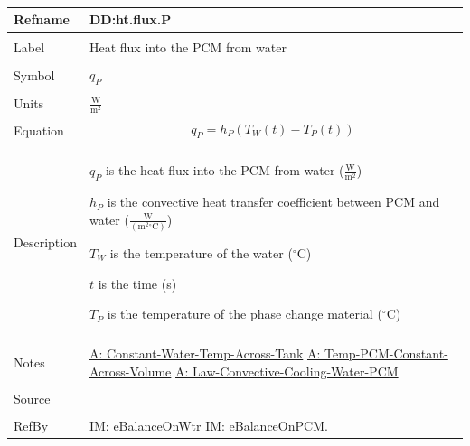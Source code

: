 \documentclass[12pt]{article}
\begin{document}
~\newline
\noindent \begin{minipage}{\textwidth}
\begin{tabular}{p{} p{}}
\toprule \textbf{Refname} & \textbf{DD:ht.flux.P}
\label{DD:ht.flux.P}
\\ \midrule \\
Label & Heat flux into the PCM from water
\\ \midrule \\
Symbol & ${q_{P}}$
\\ \midrule \\
Units & $\frac{\text{W}}{\text{m}^{2}}$
\\ \midrule \\
Equation & \begin{dmath}
           {q_{P}}={h_{P}} \left({T_{W}}\left(t\right)-{T_{P}}\left(t\right)\right)
           \end{dmath}
\\ \midrule \\
Description & \begin{symbDescription}
              \item{${q_{P}}$ is the heat flux into the PCM from water ($\frac{\text{W}}{\text{m}^{2}}$)}
              \item{${h_{P}}$ is the convective heat transfer coefficient between PCM and water ($\frac{\text{W}}{(\text{m}^{2}{}^{\circ}\text{C})}$)}
              \item{${T_{W}}$ is the temperature of the water (${}^{\circ}$C)}
              \item{$t$ is the time (s)}
              \item{${T_{P}}$ is the temperature of the phase change material (${}^{\circ}$C)}
              \end{symbDescription}
\\ \midrule \\
Notes & \hyperref[A:Constant-Water-Temp-Across-Tank]{A: Constant-Water-Temp-Across-Tank}
        \hyperref[A:Temp-PCM-Constant-Across-Volume]{A: Temp-PCM-Constant-Across-Volume}
        \hyperref[A:Law-Convective-Cooling-Water-PCM]{A: Law-Convective-Cooling-Water-PCM}
\\ \midrule \\
Source & \cite{koothoor2013}
\\ \midrule \\
RefBy & \hyperref[IM:eBalanceOnWtr]{IM: eBalanceOnWtr} \hyperref[IM:eBalanceOnPCM]{IM: eBalanceOnPCM}.
\\ \bottomrule \end{tabular}
\end{minipage}\\
\end{document}
